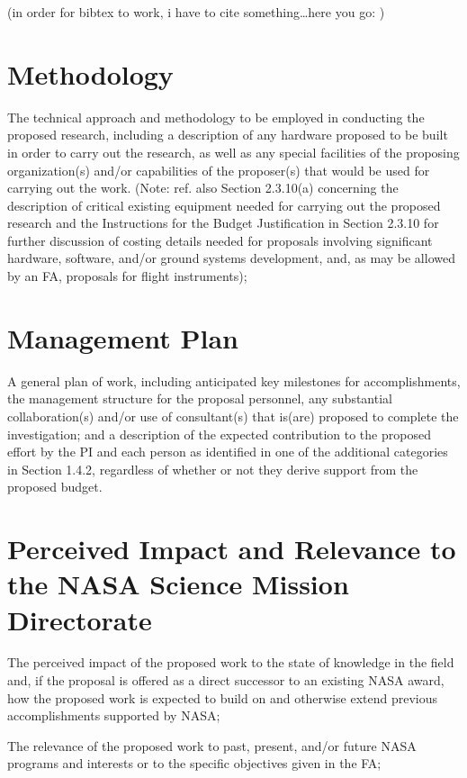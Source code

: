 \documentclass[12pt]{article}
\begin{document}
(in order for bibtex to work, i have to cite something\ldots here you
go: \citealt{Einstein1936})


\section{Methodology}
\label{sec:method}
The technical approach and methodology to be employed in conducting
the proposed research, including a description of any hardware
proposed to be built in order to carry out the research, as well as
any special facilities of the proposing organization(s) and/or
capabilities of the proposer(s) that would be used for carrying out
the work. (Note: ref. also Section 2.3.10(a) concerning the
description of critical existing equipment needed for carrying out the
proposed research and the Instructions for the Budget Justification in
Section 2.3.10 for further discussion of costing details needed for
proposals involving significant hardware, software, and/or ground
systems development, and, as may be allowed by an FA, proposals for
flight instruments);


\section{Management Plan}
\label{sec:management}
A general plan of work, including anticipated key milestones for
accomplishments, the management structure for the proposal personnel,
any substantial collaboration(s) and/or use of consultant(s) that
is(are) proposed to complete the investigation; and a description of
the expected contribution to the proposed effort by the PI and each
person as identified in one of the additional categories in Section
1.4.2, regardless of whether or not they derive support from the
proposed budget.


\section{Perceived Impact and Relevance to the NASA Science Mission Directorate}
\label{sec:relevance}
The perceived impact of the proposed work to the state of knowledge in
the field and, if the proposal is offered as a direct successor to an
existing NASA award, how the proposed work is expected to build on and
otherwise extend previous accomplishments supported by NASA;

The relevance of the proposed work to past, present, and/or future
NASA programs and interests or to the specific objectives given in the
FA;
\end{document}
